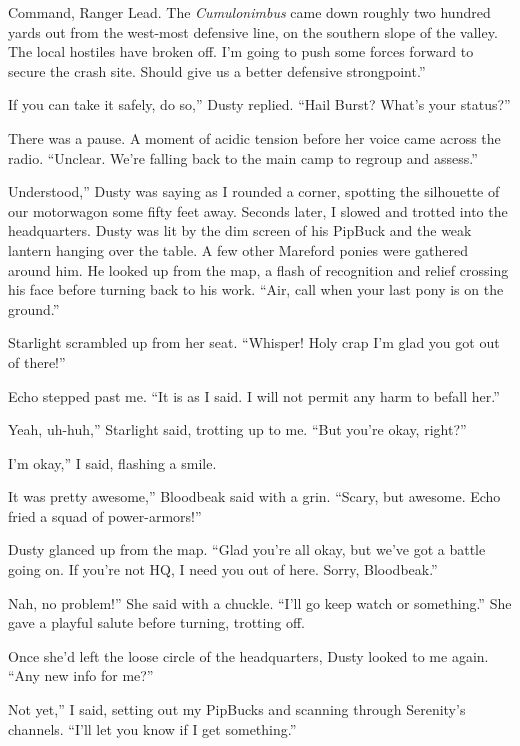 \leavevmode{}Command, Ranger Lead. The \textit{Cumulonimbus} came down roughly two hundred yards out from the west-most defensive line, on the southern slope of the valley. The local hostiles have broken off. I’m going to push some forces forward to secure the crash site. Should give us a better defensive strongpoint.”

\leavevmode{}If you can take it safely, do so,” Dusty replied. “Hail Burst? What’s your status?”

There was a pause. A moment of acidic tension before her voice came across the radio. “Unclear. We’re falling back to the main camp to regroup and assess.”

\leavevmode{}Understood,” Dusty was saying as I rounded a corner, spotting the silhouette of our motorwagon some fifty feet away. Seconds later, I slowed and trotted into the headquarters. Dusty was lit by the dim screen of his PipBuck and the weak lantern hanging over the table. A few other Mareford ponies were gathered around him. He looked up from the map, a flash of recognition and relief crossing his face before turning back to his work. “Air, call when your last pony is on the ground.”

Starlight scrambled up from her seat. “Whisper! Holy crap I’m glad you got out of there!”

Echo stepped past me. “It is as I said. I will not permit any harm to befall her.”

\leavevmode{}Yeah, uh-huh,” Starlight said, trotting up to me. “But you’re okay, right?”

\leavevmode{}I’m okay,” I said, flashing a smile.

\leavevmode{}It was pretty awesome,” Bloodbeak said with a grin. “Scary, but awesome. Echo fried a squad of power-armors!”

Dusty glanced up from the map. “Glad you’re all okay, but we’ve got a battle going on. If you’re not HQ, I need you out of here. Sorry, Bloodbeak.”

\leavevmode{}Nah, no problem!” She said with a chuckle. “I’ll go keep watch or something.” She gave a playful salute before turning, trotting off.

Once she’d left the loose circle of the headquarters, Dusty looked to me again. “Any new info for me?”

\leavevmode{}Not yet,” I said, setting out my PipBucks and scanning through Serenity’s channels. “I’ll let you know if I get something.”

